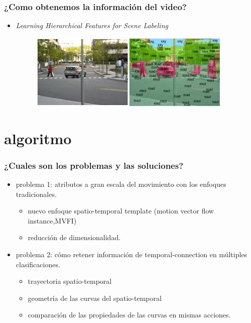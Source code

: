 \documentclass{beamer}
\begin{document}
 
\begin{frame}
\frametitle{¿Como obtenemos la información del video?}
\begin{itemize}
	\item \textit{Learning Hierarchical Features for Scene Labeling}
    
     \begin{figure}
     \includegraphics[width=0.4\linewidth]{img2/download__1_.jpg} 
    \end{figure}

 
	

\end{itemize}
 
\end{frame}
 
 
\section{algoritmo} 
 
 
 

 
 
\begin{frame}
\frametitle{¿Cuales son los problemas y las soluciones?}
 
\begin{itemize}
\item problema 1: atributos a gran escala del movimiento con los enfoques tradicionales.
	\begin{itemize}
      \item  nuevo enfoque spatio-temporal template (motion vector flow instance,MVFI)
      \item  reducción de dimensionalidad.
	\end{itemize}
\item problema 2: cómo retener información de temporal-connection en múltiples clasificaciones.
	\begin{itemize}
	\item trayectoria spatio-temporal 
	\item geometría de las curvas del spatio-temporal
	\item comparación de las propiedades de las curvas en mismas acciones.
 
	\end{itemize}
\end{itemize}
 
\end{frame}
 
\end{document}
